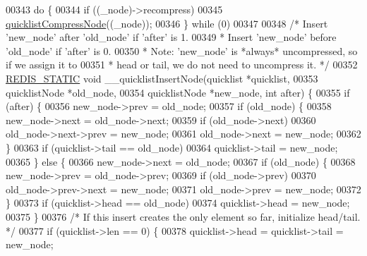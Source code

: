 \begin{DoxyCode}
{00343     \textcolor{keywordflow}{do} \textcolor{preprocessor}{\{}
00344         \textcolor{keywordflow}{if} \textcolor{preprocessor}{(}\textcolor{preprocessor}{(}\textcolor{preprocessor}{\_node}\textcolor{preprocessor}{)}\textcolor{preprocessor}{->}\textcolor{preprocessor}{recompress}\textcolor{preprocessor}{)}
00345             \hyperlink{quicklist_8c_a8f91173182833dbe55fe0de444e3d7d7}{quicklistCompressNode}\textcolor{preprocessor}{(}\textcolor{preprocessor}{(}\textcolor{preprocessor}{\_node}\textcolor{preprocessor}{)}\textcolor{preprocessor}{)}\textcolor{preprocessor}{;}
00346     \textcolor{preprocessor}{\}} \textcolor{keywordflow}{while} \textcolor{preprocessor}{(}0\textcolor{preprocessor}{)}
00347 
00348 \textcolor{comment}{/* Insert 'new\_node' after 'old\_node' if 'after' is 1.}
00349 \textcolor{comment}{ * Insert 'new\_node' before 'old\_node' if 'after' is 0.}
00350 \textcolor{comment}{ * Note: 'new\_node' is *always* uncompressed, so if we assign it to}
00351 \textcolor{comment}{ *       head or tail, we do not need to uncompress it. */}
00352 \hyperlink{quicklist_8c_a9c22c9c899458021930a552a4f94d317}{REDIS\_STATIC} \textcolor{keywordtype}{void} \_\_quicklistInsertNode(quicklist *quicklist,
00353                                         quicklistNode *old\_node,
00354                                         quicklistNode *new\_node, \textcolor{keywordtype}{int} after) \{
00355     \textcolor{keywordflow}{if} (after) \{
00356         new\_node->prev = old\_node;
00357         \textcolor{keywordflow}{if} (old\_node) \{
00358             new\_node->next = old\_node->next;
00359             \textcolor{keywordflow}{if} (old\_node->next)
00360                 old\_node->next->prev = new\_node;
00361             old\_node->next = new\_node;
00362         \}
00363         \textcolor{keywordflow}{if} (quicklist->tail == old\_node)
00364             quicklist->tail = new\_node;
00365     \} \textcolor{keywordflow}{else} \{
00366         new\_node->next = old\_node;
00367         \textcolor{keywordflow}{if} (old\_node) \{
00368             new\_node->prev = old\_node->prev;
00369             \textcolor{keywordflow}{if} (old\_node->prev)
00370                 old\_node->prev->next = new\_node;
00371             old\_node->prev = new\_node;
00372         \}
00373         \textcolor{keywordflow}{if} (quicklist->head == old\_node)
00374             quicklist->head = new\_node;
00375     \}
00376     \textcolor{comment}{/* If this insert creates the only element so far, initialize head/tail. */}
00377     \textcolor{keywordflow}{if} (quicklist->len == 0) \{
00378         quicklist->head = quicklist->tail = new\_node;
}
\end{DoxyCode}
